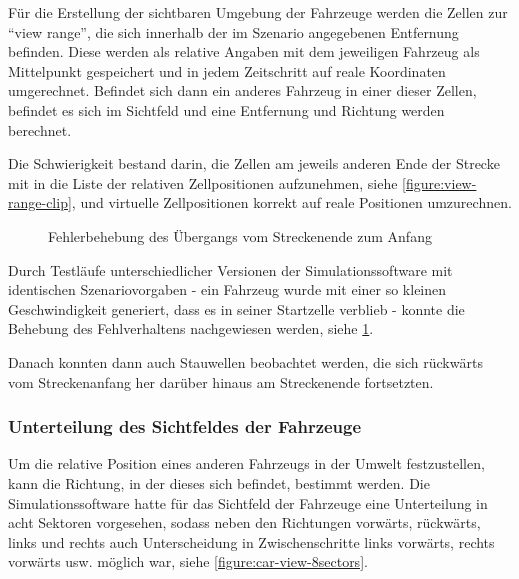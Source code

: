 Für die Erstellung der sichtbaren Umgebung der Fahrzeuge werden die Zellen zur \enquote{view range}, die sich innerhalb der im Szenario angegebenen Entfernung befinden.
Diese werden als relative Angaben mit dem jeweiligen Fahrzeug als Mittelpunkt gespeichert und in jedem Zeitschritt auf reale Koordinaten umgerechnet.
Befindet sich dann ein anderes Fahrzeug in einer dieser Zellen, befindet es sich im Sichtfeld und eine Entfernung und Richtung werden berechnet.

Die Schwierigkeit bestand darin, die Zellen am jeweils anderen Ende der Strecke mit in die Liste der relativen Zellpositionen aufzunehmen, siehe \cref{figure:view-range-clip}, und virtuelle Zellpositionen korrekt auf reale Positionen umzurechnen.

\begin{figure}[hptb]
  \centering
     \qquad 
  \caption[Fehlerbehebung: Übergang vom Streckenende zum Anfang]
          {Fehlerbehebung des Übergangs vom Streckenende zum Anfang}
  \label{figure:go-negative}
\end{figure}

Durch Testläufe unterschiedlicher Versionen der Simulationssoftware mit identischen Szenariovorgaben - ein Fahrzeug wurde mit einer so kleinen Geschwindigkeit generiert, dass es in seiner Startzelle verblieb - konnte die Behebung des Fehlverhaltens nachgewiesen werden, siehe \cref{figure:go-negative}.

Danach konnten dann auch Stauwellen beobachtet werden, die sich rückwärts vom Streckenanfang her darüber hinaus am Streckenende fortsetzten. 



\subsubsection{Unterteilung des Sichtfeldes der Fahrzeuge}
\label{sec:unterteilung-sichtfeld}

Um die relative Position eines anderen Fahrzeugs in der Umwelt festzustellen, kann die Richtung, in der dieses sich befindet, bestimmt werden.
Die Simulationssoftware hatte für das Sichtfeld der Fahrzeuge eine Unterteilung in acht Sektoren vorgesehen, sodass neben den Richtungen vorwärts, rückwärts, links und rechts auch Unterscheidung in Zwischenschritte links vorwärts, rechts vorwärts usw. möglich war, siehe \cref{figure:car-view-8sectors}.

